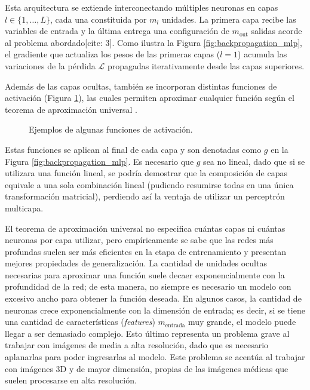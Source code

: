 Esta arquitectura se extiende interconectando múltiples neuronas en capas $l \in \{1, \dots, L\}$, cada una constituida por $m_l$ unidades. La primera capa recibe las variables de entrada y la última entrega una configuración de $m_{\text{out}}$ salidas acorde al problema abordado[cite: 3]. Como ilustra la Figura \ref{fig:backpropagation_mlp}, el gradiente que actualiza los pesos de las primeras capas ($l=1$) acumula las variaciones de la pérdida $\mathcal{L}$ propagadas iterativamente desde las capas superiores.

Además de las capas ocultas, también se incorporan distintas funciones de activación (Figura \ref{fig:activation}), las cuales permiten aproximar cualquier función según el teorema de aproximación universal \cite{universal1993}.

\begin{figure}[H]
    \centering
    \resizebox{0.75\textwidth}{!}{%
    }%
    \caption{Ejemplos de algunas funciones de activación.}
    \label{fig:activation}
\end{figure}

Estas funciones se aplican al final de cada capa y son denotadas como $g$ en la Figura \ref{fig:backpropagation_mlp}. Es necesario que $g$ sea no lineal, dado que si se utilizara una función lineal, se podría demostrar que la composición de capas equivale a una sola combinación lineal (pudiendo resumirse todas en una única transformación matricial), perdiendo así la ventaja de utilizar un perceptrón multicapa.

El teorema de aproximación universal no especifica cuántas capas ni cuántas neuronas por capa utilizar, pero empíricamente se sabe que las redes más profundas suelen ser más eficientes en la etapa de entrenamiento y presentan mejores propiedades de generalización. La cantidad de unidades ocultas necesarias para aproximar una función suele decaer exponencialmente con la profundidad de la red; de esta manera, no siempre es necesario un modelo con excesivo ancho para obtener la función deseada. En algunos casos, la cantidad de neuronas crece exponencialmente con la dimensión de entrada; es decir, si se tiene una cantidad de características (\textit{features}) $m_{\text{entrada}}$ muy grande, el modelo puede llegar a ser demasiado complejo. Esto último representa un problema grave al trabajar con imágenes de media a alta resolución, dado que es necesario aplanarlas para poder ingresarlas al modelo. Este problema se acentúa al trabajar con imágenes 3D y de mayor dimensión, propias de las imágenes médicas que suelen procesarse en alta resolución.


